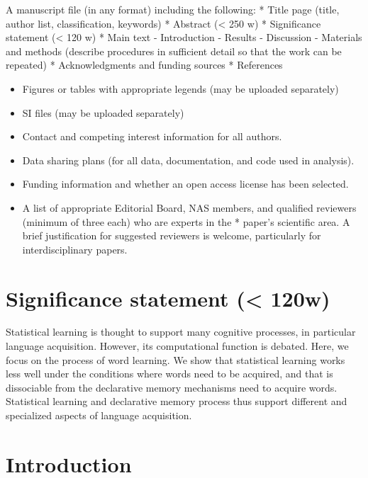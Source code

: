 \documentclass[]{article}
\providecommand{\tightlist}{%
  \setlength{\itemsep}{0pt}\setlength{\parskip}{0pt}}
\begin{document}
A manuscript file (in any format) including the following: * Title page (title, author list, classification, keywords) * Abstract (\textless{} 250 w) * Significance statement (\textless{} 120 w) * Main text - Introduction - Results - Discussion - Materials and methods (describe procedures in sufficient detail so that the work can be repeated) * Acknowledgments and funding sources * References

\begin{itemize}
\tightlist
\item
  Figures or tables with appropriate legends (may be uploaded
  separately)
\item
  SI files (may be uploaded separately)
\item
  Contact and competing interest information for all authors.
\item
  Data sharing plans (for all data, documentation, and code used in
  analysis).
\item
  Funding information and whether an open access license has been
  selected.
\item
A list of appropriate Editorial Board, NAS members, and qualified reviewers (minimum of three each) who are experts in the * paper's scientific area. A brief justification for suggested reviewers is welcome, particularly for interdisciplinary papers.
\end{itemize}

\section{Significance statement (\textless{} 120w)}
Statistical learning is thought to support many cognitive processes, in particular language acquisition. However, its computational function is debated. Here, we focus on the process of word learning. We show that statistical learning works less well under the conditions where words need to be acquired, and that is dissociable from the declarative memory mechanisms need to acquire words. Statistical learning and declarative memory process thus support different and specialized aspects of language acquisition.


\section{Introduction}\label{introduction}

\end{document}
